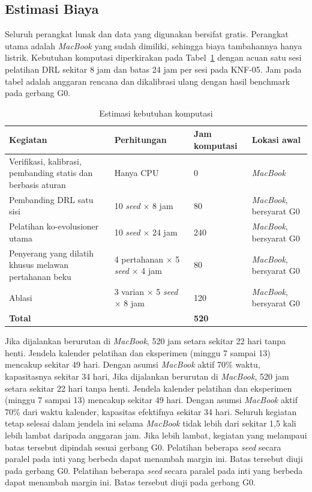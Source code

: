 \subsection{Estimasi Biaya}
\label{subsec:biaya}
Seluruh perangkat lunak dan data yang digunakan bersifat gratis. Perangkat utama adalah \textit{MacBook} yang sudah dimiliki, sehingga biaya tambahannya hanya listrik. Kebutuhan komputasi diperkirakan pada Tabel~\ref{tab:biaya} dengan acuan satu sesi pelatihan DRL sekitar 8 jam \parencite{skowronski2026adaptive} dan batas 24 jam per sesi pada KNF-05. Jam pada tabel adalah anggaran rencana dan dikalibrasi ulang dengan hasil benchmark pada gerbang G0.

\begin{table}[htbp]
\centering
\caption{Estimasi kebutuhan komputasi}
\label{tab:biaya}
\small
\begin{tabular}{|p{3.8cm}|p{3.4cm}|p{1.9cm}|p{2.7cm}|}
\hline
\textbf{Kegiatan} & \textbf{Perhitungan} & \textbf{Jam komputasi} & \textbf{Lokasi awal} \\
\hline
Verifikasi, kalibrasi, pembanding statis dan berbasis aturan & Hanya CPU & 0 & \textit{MacBook} \\
\hline
Pembanding DRL satu sisi & 10 \textit{seed} $\times$ 8 jam & 80 & \textit{MacBook}, bersyarat G0 \\
\hline
Pelatihan ko-evolusioner utama & 10 \textit{seed} $\times$ 24 jam & 240 & \textit{MacBook}, bersyarat G0 \\
\hline
Penyerang yang dilatih khusus melawan pertahanan beku & 4 pertahanan $\times$ 5 \textit{seed} $\times$ 4 jam & 80 & \textit{MacBook}, bersyarat G0 \\
\hline
Ablasi & 3 varian $\times$ 5 \textit{seed} $\times$ 8 jam & 120 & \textit{MacBook}, bersyarat G0 \\
\hline
\textbf{Total} & & \textbf{520} & \\
\hline
\end{tabular}
\end{table}

Jika dijalankan berurutan di \textit{MacBook}, 520 jam setara sekitar 22 hari tanpa henti. Jendela kalender pelatihan dan eksperimen (minggu 7 sampai 13) mencakup sekitar 49 hari. Dengan asumsi \textit{MacBook} aktif 70\% waktu, kapasitasnya sekitar 34 hari, Jika dijalankan berurutan di \textit{MacBook}, 520 jam setara sekitar 22 hari tanpa henti. Jendela kalender pelatihan dan eksperimen (minggu 7 sampai 13) mencakup sekitar 49 hari. Dengan asumsi \textit{MacBook} aktif 70\% dari waktu kalender, kapasitas efektifnya sekitar 34 hari. Seluruh kegiatan tetap selesai dalam jendela ini selama \textit{MacBook} tidak lebih dari sekitar 1,5 kali lebih lambat daripada anggaran jam. Jika lebih lambat, kegiatan yang melampaui batas tersebut dipindah sesuai gerbang G0. Pelatihan beberapa \textit{seed} secara paralel pada inti yang berbeda dapat menambah margin ini. Batas tersebut diuji pada gerbang G0. Pelatihan beberapa \textit{seed} secara paralel pada inti yang berbeda dapat menambah margin ini. Batas tersebut diuji pada gerbang G0.

